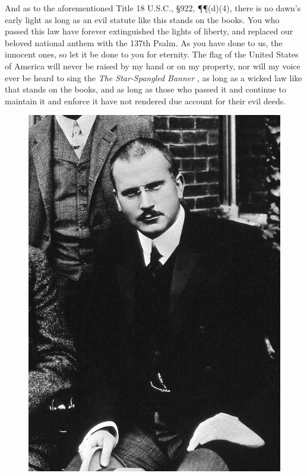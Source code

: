 \documentclass[letterpaper]{article}
\begin{document}
And as to the aforementioned Title 18 U.S.C., \S922, \P\P(d)(4), there is no dawn's early light as long as an evil statute like this stands on the books.  You who passed this law have forever extinguished the lights of liberty, and replaced our beloved national anthem with the 137th Psalm.  As you have done to us, the innocent ones, so let it be done to you for eternity.  The flag of the United States of America will never be raised by my hand or on my property, nor will my voice ever be heard to sing the \textit{The Star-Spangled Banner} \cite{key1814star}, as long as a wicked law like that stands on the books, and as long as those who passed it and continue to maintain it and enforce it have not rendered due account for their evil deeds.
\begin{figure}
\noindent\begin{minipage}{0.45\textwidth}\centering
	\includegraphics[width=1.0\textwidth]{images/Carl-Jung-mod.jpg}

\end{minipage}
\end{figure}
\end{document}
